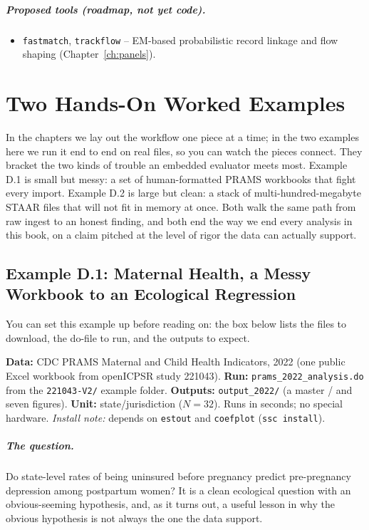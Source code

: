 \paragraph{Proposed tools (roadmap, not yet code).}
\begin{itemize}
    \item \texttt{fastmatch}, \texttt{trackflow} -- EM-based probabilistic record linkage and flow shaping (Chapter~\ref{ch:panels}).
\end{itemize}

\chapter{Two Hands-On Worked Examples}\label{app:walkthroughs}

In the chapters we lay out the workflow one piece at a time; in the two examples here we run it end to end on real files, so you can watch the pieces connect. They bracket the two kinds of trouble an embedded evaluator meets most. Example D.1 is small but messy: a set of human-formatted PRAMS workbooks that fight every import. Example D.2 is large but clean: a stack of multi-hundred-megabyte STAAR files that will not fit in memory at once. Both walk the same path from raw ingest to an honest finding, and both end the way we end every analysis in this book, on a claim pitched at the level of rigor the data can actually support.

\section*{Example D.1: Maternal Health, a Messy Workbook to an Ecological Regression}
You can set this example up before reading on: the box below lists the files to download, the do-file to run, and the outputs to expect.
\begin{kaobox}[frametitle=Get the files: \texttt{221043-V2/}]
\textbf{Data:} CDC PRAMS Maternal and Child Health Indicators, 2022 (one public Excel workbook from openICPSR study 221043).
\textbf{Run:} \texttt{prams\_2022\_analysis.do} from the \texttt{221043-V2/} example folder. \textbf{Outputs:} \texttt{output\_2022/} (a master / and seven figures).
\textbf{Unit:} state/jurisdiction ($N=32$). Runs in seconds; no special hardware. \emph{Install note:} depends on \texttt{estout} and \texttt{coefplot} (\texttt{ssc install}).
\end{kaobox}

\paragraph{The question.} Do state-level rates of being uninsured before pregnancy predict pre-pregnancy depression among postpartum women? It is a clean ecological question with an obvious-seeming hypothesis, and, as it turns out, a useful lesson in why the obvious hypothesis is not always the one the data support.

